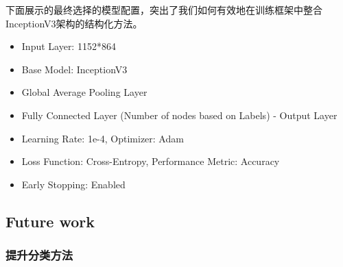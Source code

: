下面展示的最终选择的模型配置，突出了我们如何有效地在训练框架中整合InceptionV3架构的结构化方法。

    
        
        
\begin{itemize}
    \item Input Layer: 1152*864
    \item Base Model: InceptionV3
    \item Global Average Pooling Layer
    \item Fully Connected Layer (Number of nodes based on Labels) - Output Layer
    \item Learning Rate: 1e-4, Optimizer: Adam
    \item Loss Function: Cross-Entropy, Performance Metric: Accuracy
    \item Early Stopping: Enabled
\end{itemize}

\subsection{Future work}
\subsubsection{提升分类方法}

